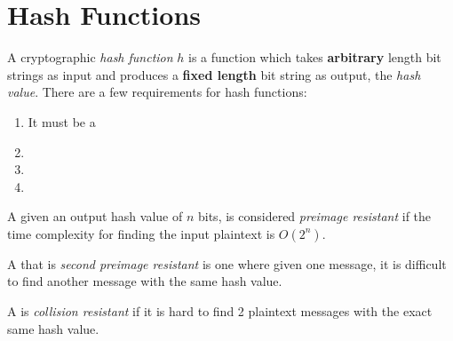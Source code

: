 \section{Hash Functions}\label{sec:Hash_Functions}
\begin{definition}\label{def:Hash_Function}
  A cryptographic \emph{hash function} $h$ is a function which takes \textbf{arbitrary} length bit strings as input and produces a \textbf{fixed length} bit string as output, the \emph{hash value}.
  There are a few requirements for hash functions:
  \begin{enumerate}[noitemsep]
  \item It must be a 
  \item {}
  \item {}
  \item {}
  \end{enumerate}
\end{definition}

\begin{definition}\label{def:Preimage_Resistant}
  A  given an output hash value of $n$ bits, is considered \emph{preimage resistant} if the time complexity for finding the input plaintext is $O(2^{n})$.
\end{definition}

\begin{definition}\label{def:Second_Preimage_Resistant}
  A  that is \emph{second preimage resistant} is one where given one message, it is difficult to find another message with the same hash value.
\end{definition}

\begin{definition}\label{def:Collision_Resistant}
  A  is \emph{collision resistant} if it is hard to find 2 plaintext messages with the exact same hash value.
\end{definition}

